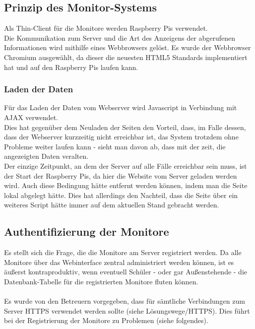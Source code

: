 \subsection{Prinzip des Monitor-Systems}

Als Thin-Client für die Monitore werden Raspberry Pis verwendet.\\
Die Kommunikation zum Server und die Art des Anzeigens der abgerufenen Informationen wird mithilfe eines Webbrowsers gelöst. Es wurde der Webbrowser Chromium ausgewählt, da dieser die neuesten HTML5 Standards implementiert hat und auf den Raspberry Pis laufen kann.

\subsubsection{Laden der Daten}

Für das Laden der Daten vom Webserver wird Javascript in Verbindung mit AJAX verwendet.\\
Dies hat gegenüber dem Neuladen der Seiten den Vorteil, dass, im Falle dessen, dass der Webserver kurzzeitig nicht erreichbar ist, das System trotzdem ohne Probleme weiter laufen kann - sieht man davon ab, dass mit der zeit, die angezeigten Daten veralten.\\
Der einzige Zeitpunkt, an dem der Server auf alle Fälle erreichbar sein muss, ist der Start der Raspberry Pis, da hier die Website vom Server geladen werden wird. Auch diese Bedingung hätte entfernt werden können, indem man die Seite lokal abgelegt hätte. Dies hat allerdings den Nachteil, dass die Seite über ein weiteres Script hätte immer auf dem aktuellen Stand gebracht werden.

\subsection{Authentifizierung der Monitore}

Es stellt sich die Frage, die die Monitore am Server registriert werden. Da alle Monitore über das Webinterface zentral administriert werden können, ist es äußerst kontraproduktiv, wenn eventuell Schüler - oder gar Außenstehende - die Datenbank-Tabelle für die registrierten Monitore fluten können.\\
\\
Es wurde von den Betreuern vorgegeben, dass für sämtliche Verbindungen zum Server HTTPS verwendet werden sollte (siehe Lösungswege/HTTPS). Dies führt bei der Registrierung der Monitore zu Problemen (siehe folgendes).

